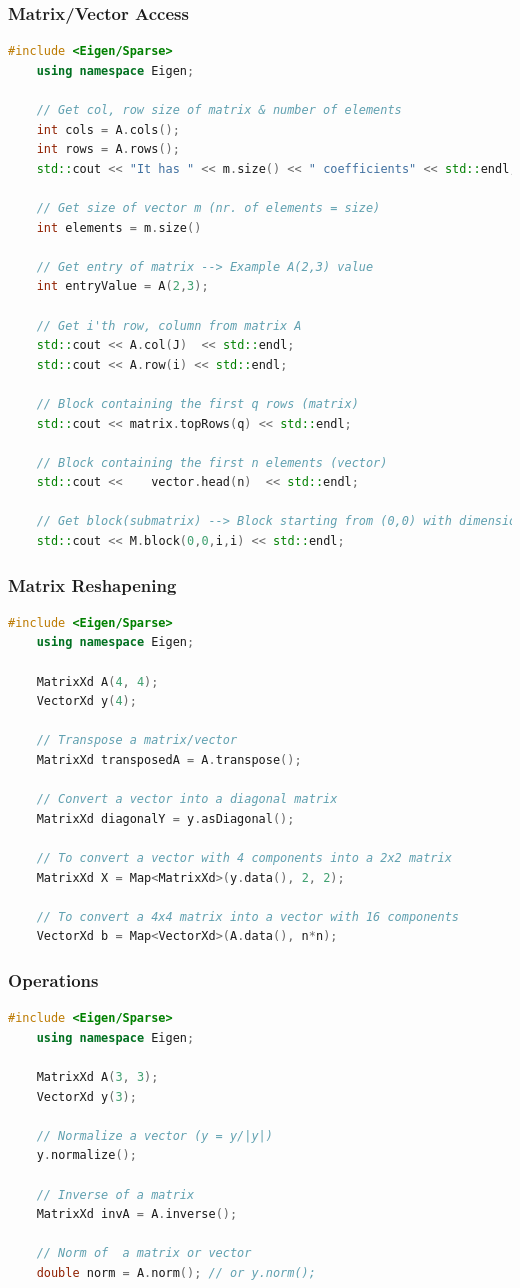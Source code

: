 \documentclass[12pt, a4paper]{article}
\begin{document}
\subsubsection{Matrix/Vector Access}
\begin{lstlisting}[language=C++]
	#include <Eigen/Sparse>
	using namespace Eigen;
	
	// Get col, row size of matrix & number of elements
	int cols = A.cols();
	int rows = A.rows();
	std::cout << "It has " << m.size() << " coefficients" << std::endl;
	
	// Get size of vector m (nr. of elements = size)
	int elements = m.size()
		
	// Get entry of matrix --> Example A(2,3) value
	int entryValue = A(2,3);
	
	// Get i'th row, column from matrix A
	std::cout << A.col(J)  << std::endl;
	std::cout << A.row(i) << std::endl;
	
	// Block containing the first q rows (matrix)
	std::cout << matrix.topRows(q) << std::endl;
	
	// Block containing the first n elements (vector)
	std::cout <<	vector.head(n)	<< std::endl;
	
	// Get block(submatrix) --> Block starting from (0,0) with dimension ixi
	std::cout << M.block(0,0,i,i) << std::endl;
\end{lstlisting}


\subsubsection{Matrix Reshapening}
\begin{lstlisting}[language=C++]
	#include <Eigen/Sparse>
	using namespace Eigen;
	
	MatrixXd A(4, 4);
	VectorXd y(4);
	
	// Transpose a matrix/vector
	MatrixXd transposedA = A.transpose();
	
	// Convert a vector into a diagonal matrix
	MatrixXd diagonalY = y.asDiagonal();
	
	// To convert a vector with 4 components into a 2x2 matrix
	MatrixXd X = Map<MatrixXd>(y.data(), 2, 2);
	
	// To convert a 4x4 matrix into a vector with 16 components
	VectorXd b = Map<VectorXd>(A.data(), n*n);
\end{lstlisting}

\subsubsection{Operations}
\begin{lstlisting}[language=C++]
	#include <Eigen/Sparse>
	using namespace Eigen;
	
	MatrixXd A(3, 3);
	VectorXd y(3);
	
	// Normalize a vector (y = y/|y|)
	y.normalize();
	
	// Inverse of a matrix
	MatrixXd invA = A.inverse();
	
	// Norm of  a matrix or vector
	double norm = A.norm(); // or y.norm();
\end{lstlisting}
\end{document}
